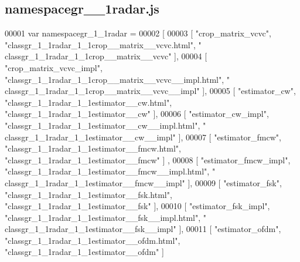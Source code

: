 \subsection{namespacegr\+\_\+\_\+1radar.\+js}
\label{namespacegr__1__1radar_8js_source}

\begin{DoxyCode}
00001 var namespacegr_1_1radar =
00002 [
00003     [ \textcolor{stringliteral}{"crop\_matrix\_vcvc"}, \textcolor{stringliteral}{"classgr\_1\_1radar\_1\_1crop\_\_matrix\_\_vcvc.html"}, \textcolor{stringliteral}{"
      classgr\_1\_1radar\_1\_1crop\_\_matrix\_\_vcvc"} ],
00004     [ \textcolor{stringliteral}{"crop\_matrix\_vcvc\_impl"}, \textcolor{stringliteral}{"classgr\_1\_1radar\_1\_1crop\_\_matrix\_\_vcvc\_\_impl.html"}, \textcolor{stringliteral}{"
      classgr\_1\_1radar\_1\_1crop\_\_matrix\_\_vcvc\_\_impl"} ],
00005     [ \textcolor{stringliteral}{"estimator\_cw"}, \textcolor{stringliteral}{"classgr\_1\_1radar\_1\_1estimator\_\_cw.html"}, \textcolor{stringliteral}{"classgr\_1\_1radar\_1\_1estimator\_\_cw"} ],
00006     [ \textcolor{stringliteral}{"estimator\_cw\_impl"}, \textcolor{stringliteral}{"classgr\_1\_1radar\_1\_1estimator\_\_cw\_\_impl.html"}, \textcolor{stringliteral}{"
      classgr\_1\_1radar\_1\_1estimator\_\_cw\_\_impl"} ],
00007     [ \textcolor{stringliteral}{"estimator\_fmcw"}, \textcolor{stringliteral}{"classgr\_1\_1radar\_1\_1estimator\_\_fmcw.html"}, \textcolor{stringliteral}{"classgr\_1\_1radar\_1\_1estimator\_\_fmcw"} ]
      ,
00008     [ \textcolor{stringliteral}{"estimator\_fmcw\_impl"}, \textcolor{stringliteral}{"classgr\_1\_1radar\_1\_1estimator\_\_fmcw\_\_impl.html"}, \textcolor{stringliteral}{"
      classgr\_1\_1radar\_1\_1estimator\_\_fmcw\_\_impl"} ],
00009     [ \textcolor{stringliteral}{"estimator\_fsk"}, \textcolor{stringliteral}{"classgr\_1\_1radar\_1\_1estimator\_\_fsk.html"}, \textcolor{stringliteral}{"classgr\_1\_1radar\_1\_1estimator\_\_fsk"} ],
00010     [ \textcolor{stringliteral}{"estimator\_fsk\_impl"}, \textcolor{stringliteral}{"classgr\_1\_1radar\_1\_1estimator\_\_fsk\_\_impl.html"}, \textcolor{stringliteral}{"
      classgr\_1\_1radar\_1\_1estimator\_\_fsk\_\_impl"} ],
00011     [ \textcolor{stringliteral}{"estimator\_ofdm"}, \textcolor{stringliteral}{"classgr\_1\_1radar\_1\_1estimator\_\_ofdm.html"}, \textcolor{stringliteral}{"classgr\_1\_1radar\_1\_1estimator\_\_ofdm"} ]

\end{DoxyCode}
